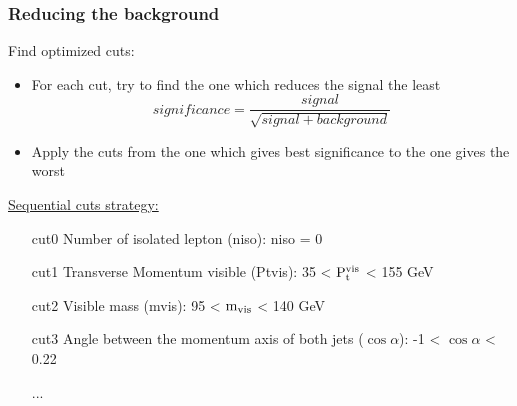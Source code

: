 \documentclass{beamer}
\begin{document}
\begin{frame}
  \frametitle{Reducing the background}
    
  \vspace{-0.2cm}
  \begin{block}{Find optimized cuts:}
      \begin{itemize}
          \item For each cut, try to find the one which reduces the signal the least
              \[significance = \frac{signal}{\sqrt{signal + background}}\]
          \item Apply the cuts from the one which gives best significance to the one gives the worst
      \end{itemize}
  \end{block}

  \vspace{-0.1cm}
  \begin{exampleblock}{\hyperlink{cuts}{Sequential cuts strategy:}}
      \begin{enumerate}
          \item [cut0] Number of isolated lepton (niso): niso = 0 %
          \item [cut1] Transverse Momentum visible (Ptvis): 35 < $\rm{P_{t}^{vis}}$ < 155 GeV
          \item [cut2] Visible mass (mvis): 95 < $\rm{m_{vis}}$ < 140 GeV
          \item [cut3] Angle between the momentum axis of both jets ($\cos{\alpha}$): -1 < $\cos{\alpha}$ < 0.22
          \item [...]
      \end{enumerate}
  \end{exampleblock}

\end{frame}
\end{document}
